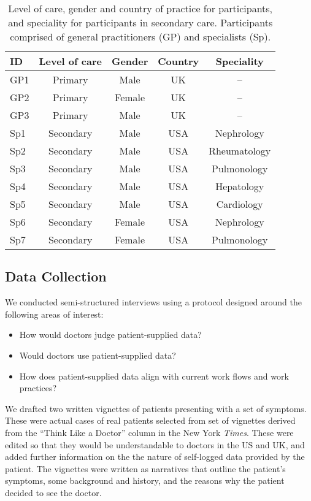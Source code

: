 \documentclass{sigchi}
\begin{document}
\begin{table}[t]
    \centering
    \setlength\extrarowheight{0.0cm}
    \begin{tabular}{lcccc}
     \toprule
     ID & Level of care & Gender & Country & Speciality \\ \midrule
     GP1 & Primary & Male & UK & -- \\
     GP2 & Primary & Female & UK & -- \\
     GP3 & Primary & Male & UK & -- \\
     
     Sp1 & Secondary & Male & USA & Nephrology \\
     Sp2 & Secondary & Male & USA & Rheumatology \\
     Sp3 & Secondary & Male & USA & Pulmonology \\
     Sp4 & Secondary & Male & USA & Hepatology \\
     Sp5 & Secondary & Male & USA & Cardiology \\
     Sp6 & Secondary & Female & USA & Nephrology \\
     Sp7 & Secondary & Female & USA & Pulmonology \\
     \bottomrule
    \end{tabular}
    \caption{Level of care, gender and country of practice for participants, and speciality for participants in secondary care. Participants comprised of general practitioners (GP) and specialists (Sp).}
    \label{tab:participants}
\end{table}

\subsection{Data Collection}
We conducted semi-structured interviews using a protocol designed around the following areas of interest:
\begin{itemize}
    \item How would doctors judge patient-supplied data?
    \item Would doctors use patient-supplied data?
    \item How does patient-supplied data align with current work flows and work practices?
\end{itemize}

We drafted two written vignettes of patients presenting with a set of symptoms.  These were actual cases of real patients selected from set of vignettes derived from the ``Think Like a Doctor'' column in the New York \emph{Times}.  These were edited  so that they would be understandable to doctors in the US and UK, and added further information on the the nature of self-logged data provided by the patient.  The vignettes were written as narratives that outline the patient's symptoms, some background and history, and the reasons why the patient decided to see the doctor.  
\end{document}
